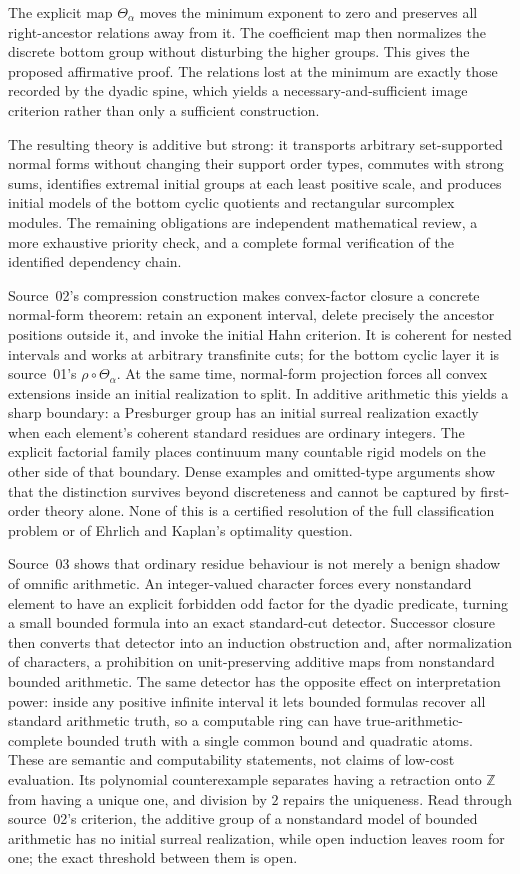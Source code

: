 \documentclass[11pt]{article}
\theoremstyle{definition}
\theoremstyle{remark}
\newcommand{\Z}{\mathbb{Z}}
\newcommand{\tht}{\Theta_{\alpha}}
\begin{document}
The explicit map $\Theta_\alpha$ moves the minimum exponent to zero
and preserves all right-ancestor relations away from it. The coefficient
map then normalizes the discrete bottom group without disturbing the
higher groups. This gives the proposed affirmative proof. The relations
lost at the minimum are exactly those recorded by the dyadic spine,
which yields a necessary-and-sufficient image criterion rather than
only a sufficient construction.

The resulting theory is additive but strong: it transports arbitrary
set-supported normal forms without changing their support order types,
commutes with strong sums, identifies extremal initial groups at each
least positive scale, and produces initial models of the bottom cyclic
quotients and rectangular surcomplex modules. The remaining obligations
are independent mathematical review, a more exhaustive priority check,
and a complete formal verification of the identified dependency chain.

Source~02's compression construction makes convex-factor closure a
concrete normal-form theorem: retain an exponent interval, delete
precisely the ancestor positions outside it, and invoke the initial Hahn
criterion. It is coherent for nested intervals and works at arbitrary
transfinite cuts; for the bottom cyclic layer it is source~01's
$\rho\circ\tht$. At the same time, normal-form projection forces all
convex extensions inside an initial realization to split. In additive
arithmetic this yields a sharp boundary: a Presburger group has an
initial surreal realization exactly when each element's coherent
standard residues are ordinary integers. The explicit factorial family
places continuum many countable rigid models on the other side of that
boundary. Dense examples and omitted-type arguments show that the
distinction survives beyond discreteness and cannot be captured by
first-order theory alone. None of this is a certified resolution of the
full classification problem or of Ehrlich and Kaplan's optimality
question.

Source~03 shows that ordinary residue behaviour is not merely a benign
shadow of omnific arithmetic. An integer-valued character forces every
nonstandard element to have an explicit forbidden odd factor for the
dyadic predicate, turning a small bounded formula into an exact
standard-cut detector. Successor closure then converts that detector into
an induction obstruction and, after normalization of characters, a
prohibition on unit-preserving additive maps from nonstandard bounded
arithmetic. The same detector has the opposite effect on interpretation
power: inside any positive infinite interval it lets bounded formulas
recover all standard arithmetic truth, so a computable ring can have
true-arithmetic-complete bounded truth with a single common bound and
quadratic atoms. These are semantic and computability statements, not
claims of low-cost evaluation. Its polynomial counterexample separates
having a retraction onto $\Z$ from having a unique one, and division by
$2$ repairs the uniqueness. Read through source~02's criterion, the
additive group of a nonstandard model of bounded arithmetic has no initial
surreal realization, while open induction leaves room for one; the exact
threshold between them is open.
\end{document}
